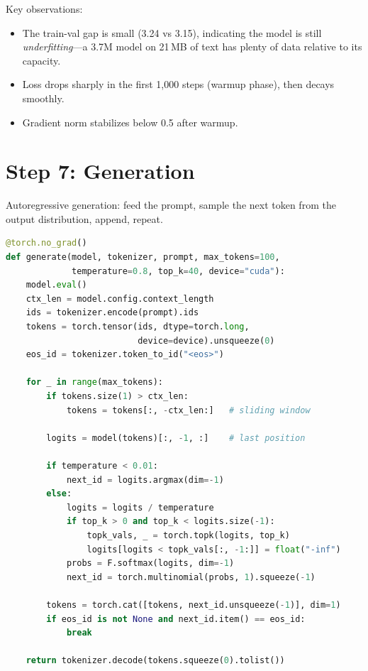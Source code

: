 Key observations:
\begin{itemize}[nosep]
  \item The train-val gap is small (3.24 vs 3.15), indicating the model is still \emph{underfitting}---a 3.7M model on 21\,MB of text has plenty of data relative to its capacity.
  \item Loss drops sharply in the first 1{,}000 steps (warmup phase), then decays smoothly.
  \item Gradient norm stabilizes below 0.5 after warmup.
\end{itemize}


\section{Step 7: Generation}
\label{sec:guide-gen}

Autoregressive generation: feed the prompt, sample the next token from the output distribution, append, repeat.

\begin{lstlisting}[language=python, caption={Autoregressive generation}]
@torch.no_grad()
def generate(model, tokenizer, prompt, max_tokens=100,
             temperature=0.8, top_k=40, device="cuda"):
    model.eval()
    ctx_len = model.config.context_length
    ids = tokenizer.encode(prompt).ids
    tokens = torch.tensor(ids, dtype=torch.long,
                          device=device).unsqueeze(0)
    eos_id = tokenizer.token_to_id("<eos>")

    for _ in range(max_tokens):
        if tokens.size(1) > ctx_len:
            tokens = tokens[:, -ctx_len:]   # sliding window

        logits = model(tokens)[:, -1, :]    # last position

        if temperature < 0.01:
            next_id = logits.argmax(dim=-1)
        else:
            logits = logits / temperature
            if top_k > 0 and top_k < logits.size(-1):
                topk_vals, _ = torch.topk(logits, top_k)
                logits[logits < topk_vals[:, -1:]] = float("-inf")
            probs = F.softmax(logits, dim=-1)
            next_id = torch.multinomial(probs, 1).squeeze(-1)

        tokens = torch.cat([tokens, next_id.unsqueeze(-1)], dim=1)
        if eos_id is not None and next_id.item() == eos_id:
            break

    return tokenizer.decode(tokens.squeeze(0).tolist())
\end{lstlisting}

